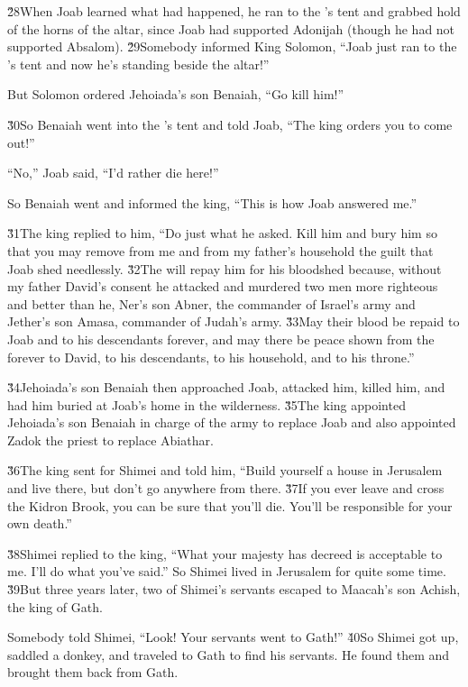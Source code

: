 \v{28}When Joab learned what had happened, he ran to the 's tent and grabbed hold of the horns of the altar, since Joab had supported Adonijah (though he had not supported Absalom). \v{29}Somebody informed King Solomon, ``Joab just ran to the 's tent and now he's standing beside the altar!''

But Solomon ordered Jehoiada's son Benaiah, ``Go kill him!''

\v{30}So Benaiah went into the 's tent and told Joab, ``The king orders you to come out!''

``No,'' Joab said, ``I'd rather die here!''

So Benaiah went and informed the king, ``This is how Joab answered me.''

\v{31}The king replied to him, ``Do just what he asked. Kill him and bury him so that you may remove from me and from my father's household the guilt that Joab shed needlessly. \v{32}The  will repay him for his bloodshed because, without my father David's consent he attacked and murdered two men more righteous and better than he, Ner's son Abner, the commander of Israel's army and Jether's son Amasa, commander of Judah's army. \v{33}May their blood be repaid to Joab and to his descendants forever, and may there be peace shown from the  forever to David, to his descendants, to his household, and to his throne.''

\v{34}Jehoiada's son Benaiah then approached Joab, attacked him, killed him, and had him buried at Joab's home in the wilderness. \v{35}The king appointed Jehoiada's son Benaiah in charge of the army to replace Joab and also appointed Zadok the priest to replace Abiathar.

\v{36}The king sent for Shimei and told him, ``Build yourself a house in Jerusalem and live there, but don't go anywhere from there. \v{37}If you ever leave and cross the Kidron Brook, you can be sure that you'll die. You'll be responsible for your own death.''

\v{38}Shimei replied to the king, ``What your majesty has decreed is acceptable to me. I'll do what you've said.'' So Shimei lived in Jerusalem for quite some time. \v{39}But three years later, two of Shimei's servants escaped to Maacah's son Achish, the king of Gath.

Somebody told Shimei, ``Look! Your servants went to Gath!'' \v{40}So Shimei got up, saddled a donkey, and traveled to Gath to find his servants. He found them and brought them back from Gath.

